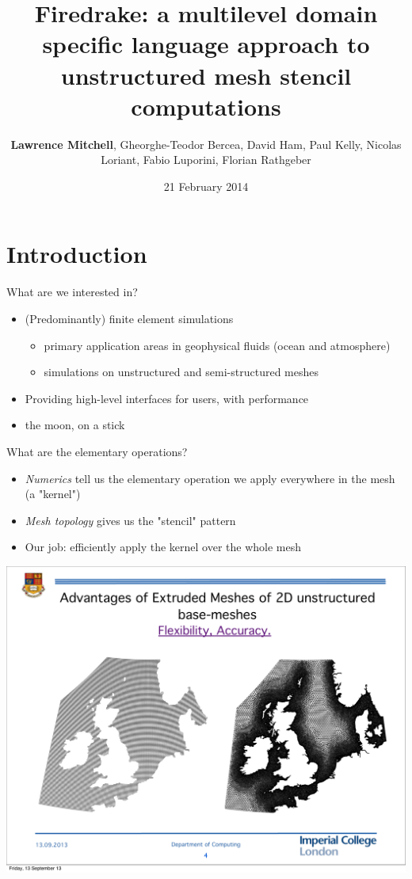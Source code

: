 \documentclass[bigger]{beamer}
\institute{Departments of Mathematics and Computing, Imperial College London}
\author{\textbf{Lawrence Mitchell}, Gheorghe-Teodor Bercea, David Ham, Paul Kelly, Nicolas Loriant, Fabio Luporini, Florian Rathgeber}
\date{21 February 2014}
\title{Firedrake: a multilevel domain specific language approach to unstructured mesh stencil computations}
\begin{document}
\maketitle

\section{Introduction}
\label{sec:orgheadline3}

\begin{frame}[label={sec:orgheadline1}]{What are we interested in?}
\begin{itemize}
\item (Predominantly) finite element simulations
\begin{itemize}
\item primary application areas in geophysical fluids (ocean and
atmosphere)
\item simulations on unstructured and semi-structured meshes
\end{itemize}
\item Providing high-level interfaces for users, with performance
\end{itemize}
\pause
\begin{itemize}
\item the moon, on a stick
\end{itemize}
\end{frame}

\begin{frame}[label={sec:orgheadline2}]{What are the elementary operations?}
\begin{itemize}
\item \emph{Numerics} tell us the elementary operation we apply everywhere in
the mesh (a "kernel")
\item \emph{Mesh topology} gives us the "stencil" pattern
\item Our job: efficiently apply the kernel over the whole mesh
\end{itemize}

\begin{center}
\includegraphics[height=0.75\textheight]{02-22-SIAM-PP-extruded-meshes.figures/uk-mesh}
\end{center}
\end{frame}
\end{document}
